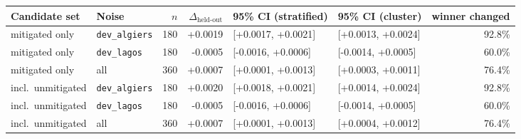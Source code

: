 \begin{tabular}{@{}llrrllr@{}}
\toprule
Candidate set & Noise & $n$ & $\Delta_{\text{held-out}}$ & 95\% CI (stratified) & 95\% CI (cluster) & winner changed\\
\midrule
mitigated only & \texttt{dev\_algiers} & 180 & +0.0019 & [+0.0017, +0.0021] & [+0.0013, +0.0024] & 92.8\% \\
mitigated only & \texttt{dev\_lagos} & 180 & -0.0005 & [-0.0016, +0.0006] & [-0.0014, +0.0005] & 60.0\% \\
mitigated only & all & 360 & +0.0007 & [+0.0001, +0.0013] & [+0.0003, +0.0011] & 76.4\% \\
incl.\ unmitigated & \texttt{dev\_algiers} & 180 & +0.0020 & [+0.0018, +0.0021] & [+0.0014, +0.0024] & 92.8\% \\
incl.\ unmitigated & \texttt{dev\_lagos} & 180 & -0.0005 & [-0.0016, +0.0006] & [-0.0014, +0.0005] & 60.0\% \\
incl.\ unmitigated & all & 360 & +0.0007 & [+0.0001, +0.0013] & [+0.0004, +0.0012] & 76.4\% \\
\bottomrule
\end{tabular}
